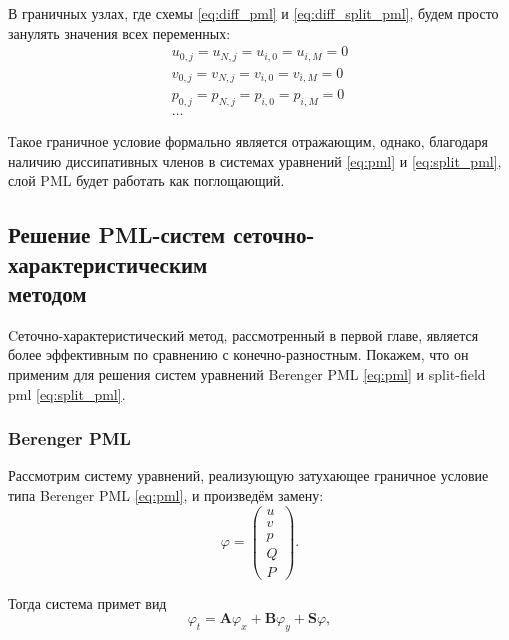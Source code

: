 \noindent В граничных узлах, где схемы \eqref{eq:diff_pml} и \eqref{eq:diff_split_pml}, будем просто занулять значения всех переменных:
\begin{equation}
    \begin{gathered}
        u_{0,j} = u_{N,j} = u_{i,0} = u_{i,M} = 0 \\
        v_{0,j} = v_{N,j} = v_{i,0} = v_{i,M} = 0 \\
        p_{0,j} = p_{N,j} = p_{i,0} = p_{i,M} = 0 \\
        \dots
    \end{gathered}
    \label{eq:pml_border}
\end{equation}
    
Такое граничное условие формально является отражающим, однако, благодаря наличию диссипативных членов в системах уравнений \eqref{eq:pml} и \eqref{eq:split_pml}, слой PML будет работать как поглощающий.

\subsection[Решение PML-систем сеточно-характеристическим методом]{Решение PML-систем сеточно-характеристическим\\методом}
    
Cеточно-характеристический метод, рассмотренный в первой главе, является более эффективным по сравнению с конечно-разностным. Покажем, что он применим для решения систем уравнений Berenger PML \eqref{eq:pml} и split-field pml \eqref{eq:split_pml}.
    
\subsubsection{Berenger PML}
    
Рассмотрим систему уравнений, реализующую затухающее граничное условие типа Berenger PML \eqref{eq:pml}, и произведём замену:
\begin{equation*}
    \varphi = \begin{pmatrix}
        u \\ v \\ p \\ Q \\ P
    \end{pmatrix} .
\end{equation*}
    
\noindent Тогда система примет вид
\begin{equation}
    \varphi_t = \pmb{A}\varphi_x + \pmb{B}\varphi_y + \pmb{S}\varphi ,
    \label{eq:gcm_berenger_pml}
\end{equation}

